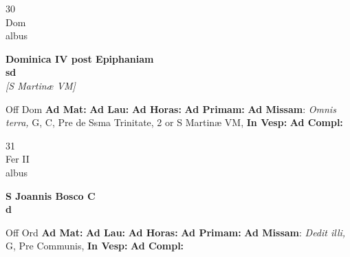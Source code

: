 \documentclass[10pt, openany]{book}
\begin{document}
    \begin{center}
        \begin{minipage}{3.5in}
            \vspace{2em}
            \begin{minipage}{0.5in}
                {\Huge 30} \\
                {\normalsize Dom} \\
                {\normalsize albus}
            \end{minipage}
            \begin{minipage}{3.0in}
                \textbf{ \large Dominica IV post Epiphaniam \\
                \textnormal{\normalsize sd}} \\ \textit{[S Martinæ VM]} \\ 
            \end{minipage}
            \begin{justify}Off Dom
                \textbf{Ad Mat: }
                \textbf{Ad Lau: }
                \textbf{Ad Horas: }
                \textbf{Ad Primam: }\textbf{Ad Missam}: \textit{Omnis terra,} G, C, Pre de Ssma Trinitate, 2 or S Martinæ VM,  
                \textbf{In Vesp: }
                \textbf{Ad Compl: }
            \end{justify}
        \end{minipage}
    \end{center}

    \begin{center}
        \begin{minipage}{3.5in}
            \vspace{2em}
            \begin{minipage}{0.5in}
                {\Huge 31} \\
                {\normalsize Fer II} \\
                {\normalsize albus}
            \end{minipage}
            \begin{minipage}{3.0in}
                \textbf{ \large S Joannis Bosco C \\
                \textnormal{\normalsize d}} \\ 
            \end{minipage}
            \begin{justify}Off Ord
                \textbf{Ad Mat: }
                \textbf{Ad Lau: }
                \textbf{Ad Horas: }
                \textbf{Ad Primam: }\textbf{Ad Missam}: \textit{Dedit illi,} G, Pre Communis,  
                \textbf{In Vesp: }
                \textbf{Ad Compl: }
            \end{justify}
        \end{minipage}
    \end{center}
\end{document}
